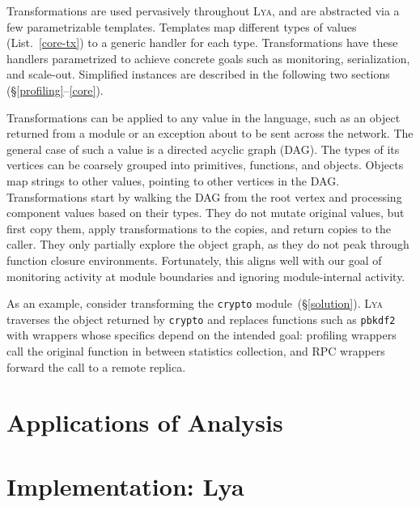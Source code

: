 \documentclass[letterpaper,twocolumn,10pt]{article}
\newcommand{\ttt}[1]{\texttt{#1}}
\newcommand{\sx}[1]{(\S\ref{#1})}
\newcommand{\sys}{{\scshape Lya}\xspace}
\begin{document}
Transformations are used pervasively throughout \sys, and are abstracted via a few parametrizable templates.
Templates map different types of values (List.~\ref{core-tx}) to a generic handler for each type.
Transformations have these handlers parametrized to achieve concrete goals such as monitoring, serialization, and scale-out.
Simplified instances are described in the following two sections (\S\ref{profiling}--\ref{core}).

Transformations can be applied to any value in the language, such as an object returned from a module or an exception about to be sent across the network.
The general case of such a value is a directed acyclic graph (DAG).
The types of its vertices can be coarsely grouped into primitives, functions, and objects.
Objects map strings to other values, pointing to other vertices in the DAG.
Transformations start by walking the DAG from the root vertex and processing component values based on their types.
They do not mutate original values, but first copy them, apply transformations to the copies, and return copies to the caller.
They only partially explore the object graph, as they do not peak through function closure environments.
Fortunately, this aligns well with our goal of monitoring activity at module boundaries and ignoring module-internal activity.

As an example, consider transforming the \ttt{crypto} module~\sx{solution}.
\sys traverses the object returned by \ttt{crypto} and replaces functions such as \ttt{pbkdf2} with wrappers whose specifics depend on the intended goal:
  profiling wrappers call the original function in between statistics collection, and RPC wrappers forward the call to a remote replica.




\section{Applications of Analysis}
\label{apps}


\section{Implementation: Lya}
\label{impl}
\end{document}
